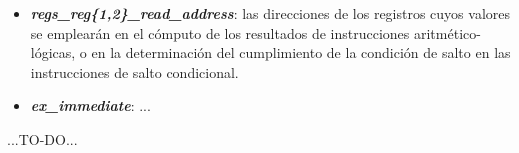 \begin{itemize}
  \item \textbf{\textit{regs\_reg\{1,2\}\_read\_address}}: las direcciones de los registros cuyos valores se emplearán en el cómputo de los resultados de instrucciones aritmético-lógicas, o en la determinación del cumplimiento de la condición de salto en las instrucciones de salto condicional.
  \vspace{-0.2cm}
  \item \textbf{\textit{ex\_immediate}}: ...
\end{itemize}

...TO-DO...